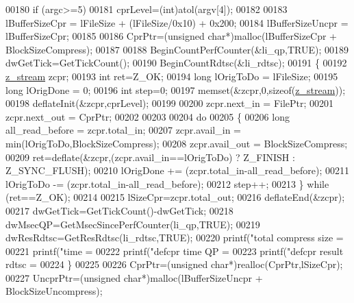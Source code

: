 \begin{DoxyCode}
{{{{00180     \textcolor{keywordflow}{if} (argc>=5)
00181         cprLevel=(int)atol(argv[4]);
00182 
00183     lBufferSizeCpr = lFileSize + (lFileSize/0x10) + 0x200;
00184     lBufferSizeUncpr = lBufferSizeCpr;
00185 
00186     CprPtr=(\textcolor{keywordtype}{unsigned} \textcolor{keywordtype}{char}*)malloc(lBufferSizeCpr + BlockSizeCompress);
00187 
00188     BeginCountPerfCounter(&li\_qp,TRUE);
00189     dwGetTick=GetTickCount();
00190     BeginCountRdtsc(&li\_rdtsc);
00191     \{
00192         \hyperlink{structz__stream__s}{z\_stream} zcpr;
00193         \textcolor{keywordtype}{int} ret=Z\_OK;
00194         \textcolor{keywordtype}{long} lOrigToDo = lFileSize;
00195         \textcolor{keywordtype}{long} lOrigDone = 0;
00196         \textcolor{keywordtype}{int} step=0;
00197         memset(&zcpr,0,\textcolor{keyword}{sizeof}(\hyperlink{structz__stream__s}{z\_stream}));
00198         deflateInit(&zcpr,cprLevel);
00199 
00200         zcpr.next\_in = FilePtr;
00201         zcpr.next\_out = CprPtr;
00202 
00203 
00204         \textcolor{keywordflow}{do}
00205         \{
00206             \textcolor{keywordtype}{long} all\_read\_before = zcpr.total\_in;
00207             zcpr.avail\_in = min(lOrigToDo,BlockSizeCompress);
00208             zcpr.avail\_out = BlockSizeCompress;
00209             ret=deflate(&zcpr,(zcpr.avail\_in==lOrigToDo) ? Z\_FINISH : Z\_SYNC\_FLUSH);
00210             lOrigDone += (zcpr.total\_in-all\_read\_before);
00211             lOrigToDo -= (zcpr.total\_in-all\_read\_before);
00212             step++;
00213         \} \textcolor{keywordflow}{while} (ret==Z\_OK);
00214 
00215         lSizeCpr=zcpr.total\_out;
00216         deflateEnd(&zcpr);
00217         dwGetTick=GetTickCount()-dwGetTick;
00218         dwMsecQP=GetMsecSincePerfCounter(li\_qp,TRUE);
00219         dwResRdtsc=GetResRdtsc(li\_rdtsc,TRUE);
00220         printf(\textcolor{stringliteral}{"total compress size = %
00221         printf(\textcolor{stringliteral}{"time = %
00222         printf(\textcolor{stringliteral}{"defcpr time QP = %
00223         printf(\textcolor{stringliteral}{"defcpr result rdtsc = %
00224     \}
00225 
00226     CprPtr=(\textcolor{keywordtype}{unsigned} \textcolor{keywordtype}{char}*)realloc(CprPtr,lSizeCpr);
00227     UncprPtr=(\textcolor{keywordtype}{unsigned} \textcolor{keywordtype}{char}*)malloc(lBufferSizeUncpr + BlockSizeUncompress);
}}}}}}}}
\end{DoxyCode}
